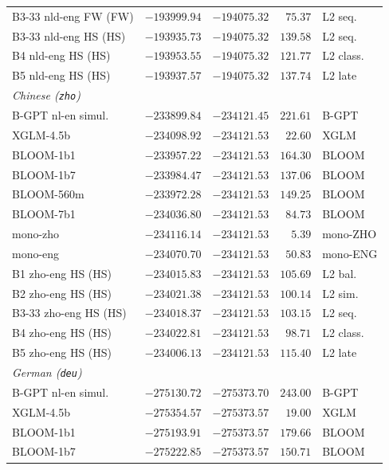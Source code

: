 \begin{table}[!ht]
\begin{tabular}{lrrrl}
    B3-33 nld-eng FW (FW) & $-193999.94$ & $-194075.32$ & $75.37$ & L2 seq. \\
    B3-33 nld-eng HS (HS) & $-193935.73$ & $-194075.32$ & $139.58$ & L2 seq. \\
    B4 nld-eng HS (HS) & $-193953.55$ & $-194075.32$ & $121.77$ & L2 class. \\
    B5 nld-eng HS (HS) & $-193937.57$ & $-194075.32$ & $137.74$ & L2 late \\
    \midrule
    \multicolumn{5}{l}{\textit{Chinese (\texttt{zho})}} \\
    \midrule
    B-GPT nl-en simul. & $-233899.84$ & $-234121.45$ & $221.61$ & B-GPT \\
    XGLM-4.5b & $-234098.92$ & $-234121.53$ & $22.60$ & XGLM \\
    BLOOM-1b1 & $-233957.22$ & $-234121.53$ & $164.30$ & BLOOM \\
    BLOOM-1b7 & $-233984.47$ & $-234121.53$ & $137.06$ & BLOOM \\
    BLOOM-560m & $-233972.28$ & $-234121.53$ & $149.25$ & BLOOM \\
    BLOOM-7b1 & $-234036.80$ & $-234121.53$ & $84.73$ & BLOOM \\
    mono-zho & $-234116.14$ & $-234121.53$ & $5.39$ & mono-ZHO \\
    mono-eng & $-234070.70$ & $-234121.53$ & $50.83$ & mono-ENG \\
    B1 zho-eng HS (HS) & $-234015.83$ & $-234121.53$ & $105.69$ & L2 bal. \\
    B2 zho-eng HS (HS) & $-234021.38$ & $-234121.53$ & $100.14$ & L2 sim. \\
    B3-33 zho-eng HS (HS) & $-234018.37$ & $-234121.53$ & $103.15$ & L2 seq. \\
    B4 zho-eng HS (HS) & $-234022.81$ & $-234121.53$ & $98.71$ & L2 class. \\
    B5 zho-eng HS (HS) & $-234006.13$ & $-234121.53$ & $115.40$ & L2 late \\
    \midrule
    \multicolumn{5}{l}{\textit{German (\texttt{deu})}} \\
    \midrule
    B-GPT nl-en simul. & $-275130.72$ & $-275373.70$ & $243.00$ & B-GPT \\
    XGLM-4.5b & $-275354.57$ & $-275373.57$ & $19.00$ & XGLM \\
    BLOOM-1b1 & $-275193.91$ & $-275373.57$ & $179.66$ & BLOOM \\
    BLOOM-1b7 & $-275222.85$ & $-275373.57$ & $150.71$ & BLOOM \\

\end{tabular}
\end{table}
